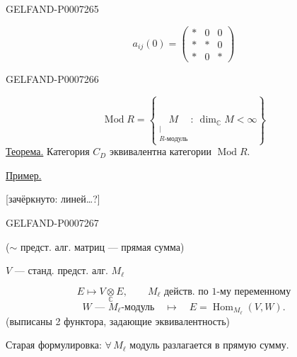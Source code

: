 \begin{GelfandAdjacentEvidence}{GELFAND-P000726}{5}


\[
a_{ij}(0)=\begin{pmatrix}\ast&0&0\\\ast&\ast&0\\\ast&0&\ast\end{pmatrix}
\]
\end{GelfandAdjacentEvidence}
\begin{GelfandAdjacentEvidence}{GELFAND-P000726}{6}


\[
\operatorname{Mod} R=
\left\{\underset{\substack{|\\R\text{-модуль}}}{M}:\ \dim_{\mathbb C}M<\infty\right\}
\]
\underline{Теорема.} Категория \(C_D\) эквивалентна категории \(\operatorname{Mod} R\).

\underline{Пример.}

 [зачёркнуто: линей\ldots?] 
\end{GelfandAdjacentEvidence}
\begin{GelfandAdjacentEvidence}{GELFAND-P000726}{7}


(\(\sim\) предст. алг. матриц --- прямая сумма)

\(V\) --- станд. предст. алг. \(M_\ell\)
\end{GelfandAdjacentEvidence}

\[
E\longmapsto V\underset{\mathbb C}{\otimes}E,\qquad
M_\ell\text{ действ. по 1-му переменному}
\]
\[
W\text{ --- }M_\ell\text{-модуль}\quad\longmapsto\quad
E=\operatorname{Hom}_{M_\ell}(V,W).
\]
(выписаны 2 функтора, задающие эквивалентность)

Старая формулировка: \(\forall\, M_\ell\) модуль разлагается в прямую сумму.


